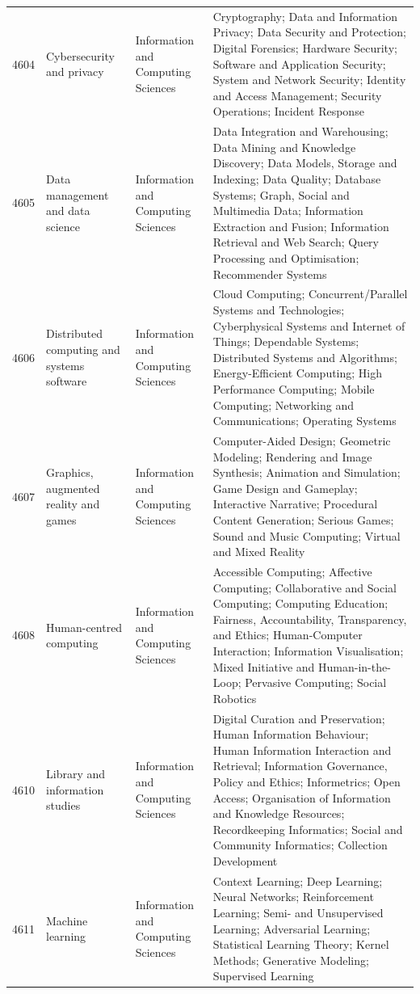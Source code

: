 \begin{longtable}{r p{2.45cm} p{2.55cm} p{6.15cm}}
4604 & Cybersecurity and privacy & Information and Computing Sciences & Cryptography; Data and Information Privacy; Data Security and Protection; Digital Forensics; Hardware Security; Software and Application Security; System and Network Security; Identity and Access Management; Security Operations; Incident Response \\
4605 & Data management and data science & Information and Computing Sciences & Data Integration and Warehousing; Data Mining and Knowledge Discovery; Data Models, Storage and Indexing; Data Quality; Database Systems; Graph, Social and Multimedia Data; Information Extraction and Fusion; Information Retrieval and Web Search; Query Processing and Optimisation; Recommender Systems \\
4606 & Distributed computing and systems software & Information and Computing Sciences & Cloud Computing; Concurrent/Parallel Systems and Technologies; Cyberphysical Systems and Internet of Things; Dependable Systems; Distributed Systems and Algorithms; Energy-Efficient Computing; High Performance Computing; Mobile Computing; Networking and Communications; Operating Systems \\
4607 & Graphics, augmented reality and games & Information and Computing Sciences & Computer-Aided Design; Geometric Modeling; Rendering and Image Synthesis; Animation and Simulation; Game Design and Gameplay; Interactive Narrative; Procedural Content Generation; Serious Games; Sound and Music Computing; Virtual and Mixed Reality \\
4608 & Human-centred computing & Information and Computing Sciences & Accessible Computing; Affective Computing; Collaborative and Social Computing; Computing Education; Fairness, Accountability, Transparency, and Ethics; Human-Computer Interaction; Information Visualisation; Mixed Initiative and Human-in-the-Loop; Pervasive Computing; Social Robotics \\
4610 & Library and information studies & Information and Computing Sciences & Digital Curation and Preservation; Human Information Behaviour; Human Information Interaction and Retrieval; Information Governance, Policy and Ethics; Informetrics; Open Access; Organisation of Information and Knowledge Resources; Recordkeeping Informatics; Social and Community Informatics; Collection Development \\
4611 & Machine learning & Information and Computing Sciences & Context Learning; Deep Learning; Neural Networks; Reinforcement Learning; Semi- and Unsupervised Learning; Adversarial Learning; Statistical Learning Theory; Kernel Methods; Generative Modeling; Supervised Learning \\

\end{longtable}
